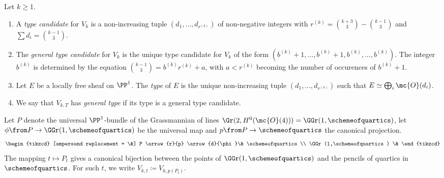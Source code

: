 \begin{definition}
Let $k\geq 1$.

\begin{enumerate}
\item A \emph{type candidate} for $V_k$ is a non-increasing tuple $(d_1,\dotsc,d_{r^{(k)}})$ of non-negative integers with
$r^{(k)}=\binom{k+3}{3}-\binom{k-1}{3}$ and $\sum d_i = \binom{k-1}{3}$.

\item The \emph{general type candidate} for $V_k$ is the unique type candidate for $V_k$ of the form
$(b^{(k)} + 1,\dotsc,b^{(k)} + 1,b^{(k)},\dotsc,b^{(k)})$. The integer $b^{(k)}$ is determined by the equation
$\binom{k-1}{3} = b^{(k)} r^{(k)} + a$, with $a < r^{(k)}$ becoming the number of occurences of $b^{(k)} +1$.

\item Let $E$ be a locally free sheaf on $\PP^1$. The \emph{type} of $E$ is the unique non-increasing tuple $(d_1,\dotsc,d_{r^{(k)}})$ such that $E \simeq \bigoplus_i \mc{O}(d_i)$.

\item We say that $V_{k,T}$ has \emph{general type} if its type is a general type candidate.
\end{enumerate}

\begin{definition}
Let $P$ denote the universal $\PP^1$-bundle of the Grassmannian of lines $\Gr(2,H^0(\mc{O}(4))) = \GGr(1,\schemeofquartics)$, let $\phi\from P\to \GGr(1,\schemeofquartics)$ be the universal map and $p\from P\to \schemeofquartics$ the canonical projection.
\[
\begin{tikzcd} [ampersand replacement = \&]
P \arrow{r}{p} \arrow{d}{\phi}\& \schemeofquartics \\
\GGr(1,\schemeofquartics) \& 
\end{tikzcd}
\]
The mapping $t\mapsto P_t$ gives a canonical bijection between the points of $\GGr(1,\schemeofquartics)$ and the pencils of quartics in $\schemeofquartics$. For such $t$, we write $V_{k,t} \coloneqq V_{k,p(P_t)}$.
\end{definition}

\end{definition}


